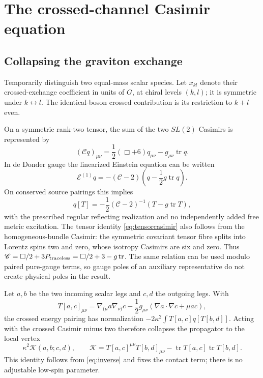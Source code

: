 \documentclass[11pt,a4paper]{article}
\numberwithin{equation}{section}
\theoremstyle{remark}\newtheorem{remark}[theorem]{Remark}
\newcommand{\tr}{\operatorname{tr}}
\newcommand{\kap}{\kappa}
\newcommand{\calC}{\mathscr C}
\begin{document}
\section{The crossed-channel Casimir equation}
\label{sec:cross}

\subsection{Collapsing the graviton exchange}

Temporarily distinguish two equal-mass scalar species. Let $x_{kl}$ denote their crossed-exchange coefficient in units of $G$, at chiral levels $(k,l)$; it is symmetric under $k\leftrightarrow l$. The identical-boson crossed contribution is its restriction to $k+l$ even.

On a symmetric rank-two tensor, the sum of the two $SL(2)$ Casimirs is represented by
\begin{equation}
 (\calC q)_{\mu\nu}=\frac12(\Box+6)q_{\mu\nu}-g_{\mu\nu}\tr q.
 \label{eq:tensorcasimir}
\end{equation}
In de Donder gauge the linearized Einstein equation can be written
\begin{equation}
 \mathcal E^{(1)}q=-(\calC-2)\left(q-\frac12g\tr q\right).
\end{equation}
On conserved source pairings this implies
\begin{equation}
 q[T]=-\frac12(\calC-2)^{-1}(T-g\tr T),
 \label{eq:inverse}
\end{equation}
with the prescribed regular reflecting realization and no independently added free metric excitation. The tensor identity \eqref{eq:tensorcasimir} also follows from the homogeneous-bundle Casimir: the symmetric covariant tensor fibre splits into Lorentz spins two and zero, whose isotropy Casimirs are six and zero. Thus $\calC=\Box/2+3P_{\rm traceless}=\Box/2+3-g\tr$. The same relation can be used modulo paired pure-gauge terms, so gauge poles of an auxiliary representative do not create physical poles in the result.

Let $a,b$ be the two incoming scalar legs and $c,d$ the outgoing legs. With
\begin{equation}
 T[a,c]_{\mu\nu}=\nabla_{(\mu}a\nabla_{\nu)}c
 -\frac12g_{\mu\nu}(\nabla a\cdot\nabla c+\mu ac),
\end{equation}
the crossed energy pairing has normalization $-2\kap^2\int T[a,c]q[T[b,d]]$. Acting with the crossed Casimir minus two therefore collapses the propagator to the local vertex
\begin{equation}
 \kap^2\mathcal K(a,b;c,d),\qquad
 \mathcal K=T[a,c]^{\mu\nu}T[b,d]_{\mu\nu}
 -\tr T[a,c]\tr T[b,d].
 \label{eq:contactK}
\end{equation}
This identity follows from \eqref{eq:inverse} and fixes the contact term; there is no adjustable low-spin parameter.
\end{document}
